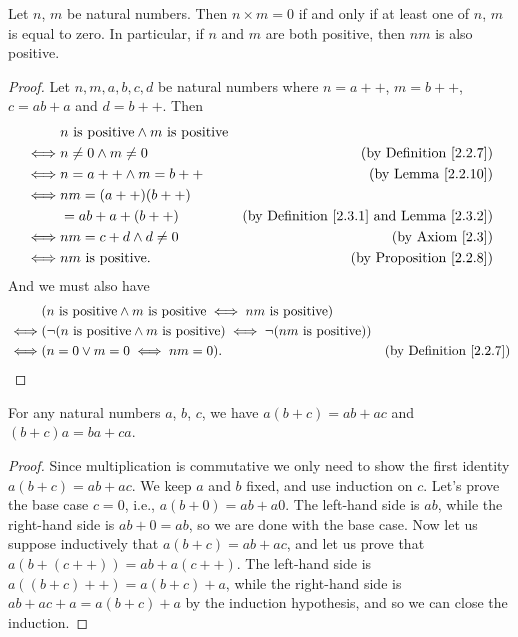 \begin{lemma}\label{2.3.3}
Let \(n\), \(m\) be natural numbers.
Then \(n \times m = 0\) if and only if at least one of \(n\), \(m\) is equal to zero.
In particular, if \(n\) and \(m\) are both positive, then \(nm\) is also positive.
\end{lemma}

\begin{proof}
Let \(n, m, a, b, c, d\) be natural numbers where \(n = a++\), \(m = b++\), \(c = ab + a\) and \(d = b++\).
Then
\begin{align*}
& n \text{ is positive} \land m \text{ is positive} \\
\iff & n \neq 0 \land m \neq 0 & \text{(by Definition \ref{2.2.7})} \\
\iff & n = a++ \land m = b++ & \text{(by Lemma \ref{2.2.10})} \\
\iff & nm = (a++)(b++) \\
&= ab + a + (b++) & \text{(by Definition \ref{2.3.1} and Lemma \ref{2.3.2})} \\
\iff & nm = c + d \land d \neq 0 & \text{(by Axiom \ref{2.3})} \\
\iff & nm \text{ is positive}. & \text{(by Proposition \ref{2.2.8})}
\end{align*}
And we must also have
\begin{align*}
& (n \text{ is positive} \land m \text{ is positive} \iff nm \text{ is positive}) \\
\iff & (\lnot (n \text{ is positive} \land m \text{ is positive}) \iff \lnot (nm \text{ is positive})) \\
\iff & (n = 0 \lor m = 0 \iff nm = 0). & \text{(by Definition \ref{2.2.7})}
\end{align*}
\end{proof}

\begin{proposition}\label{2.3.4}
For any natural numbers \(a\), \(b\), \(c\), we have \(a(b + c) = ab + ac\) and \((b + c)a = ba + ca\).
\end{proposition}

\begin{proof}
Since multiplication is commutative we only need to show the first identity \(a(b + c) = ab + ac\).
We keep \(a\) and \(b\) fixed, and use induction on \(c\).
Let’s prove the base case \(c = 0\), i.e., \(a(b + 0) = ab + a0\).
The left-hand side is \(ab\), while the right-hand side is \(ab + 0 = ab\), so we are done with the base case.
Now let us suppose inductively that \(a(b + c) = ab + ac\), and let us prove that \(a(b + (c++)) = ab + a(c++)\).
The left-hand side is \(a((b + c)++) = a(b + c) + a\), while the right-hand side is \(ab + ac + a = a(b + c) + a\) by the induction hypothesis, and so we can close the induction.
\end{proof}

